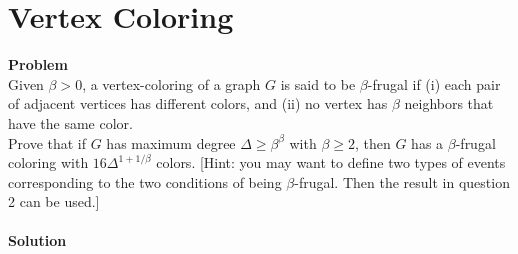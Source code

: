 	\section{Vertex Coloring}
	\textbf{Problem}\\
	Given $\beta > 0$, a vertex-coloring of a graph $G$ is said to be $\beta$-frugal if (i) each pair of adjacent vertices has different colors, and (ii) no vertex has $\beta$ neighbors that have the same color.\\
	Prove that if $G$ has maximum degree $\Delta \ge \beta^\beta$ with $\beta \ge 2$, then $G$ has a $\beta$-frugal coloring with $16\Delta^{1+1/\beta}$ colors. [Hint: you may want to define two types of events corresponding to the two conditions of being $\beta$-frugal. Then the result in question 2 can be used.]\\\\
	\textbf{Solution}\\
